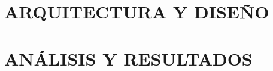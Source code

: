 \documentclass[openany,12pt,letterpaper]{book}
\begin{document}
	\part{ARQUITECTURA Y DISEÑO}
	
	
	
	
	
	
	


	\part{ANÁLISIS Y RESULTADOS}
	
	

	
	
	
	
	
\end{document}
